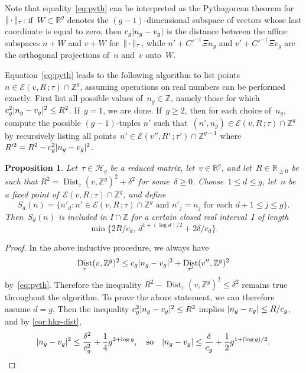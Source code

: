 \documentclass[12pt,oneside]{amsart}
\numberwithin{equation}{section}
\newtheorem{prop}[equation]{Proposition}
\theoremstyle{definition}
\newcommand{\Z}{\mathbb{Z}}
\newcommand{\R}{\mathbb{R}}
\newcommand{\Half}{\mathcal{H}}
\newcommand{\placeholder}{\,\cdot\,}
\newcommand{\eld}[3]{\ensuremath{\mathcal{E}(#1, #2\,; #3)}}
\DeclareMathOperator{\Dist}{Dist}
\DeclarePairedDelimiter{\abs}{|}{|}
\DeclarePairedDelimiter{\norm}{\|}{\|}
\begin{document}
Note that equality~\eqref{eq:pyth} can be interpreted as the Pythagorean
theorem for~$\norm{\placeholder}_\tau$: if~$W\subset \R^g$ denotes the
$(g-1)$-dimensional subspace of vectors whose last coordinate is equal to
zero, then $c_{g}\abs{n_{g} - v_{g}}$ is the distance between the affine
subspaces $n + W$ and $v + W$ for~$\norm{\placeholder}_\tau$, while
$n' + C'^{-1} \Xi n_{g}$ and $v' + C'^{-1} \Xi v_{g}$ are the orthogonal
projections of~$n$ and~$v$ onto~$W$.

Equation~\eqref{eq:pyth} leads to the following algorithm to list points
$n\in \eld{v}{R}{\tau}\cap \Z^g$, assuming operations on real numbers can be
performed exactly. First list all possible values of~$n_g \in \Z$, namely those
for which $c_g^2\abs{n_g - v_g}^2 \leq R^2$. If~$g=1$, we are done.
If~$g\geq 2$, then for each choice of~$n_g$, compute the possible
$(g-1)$-tuples $n'$ such that~$(n',n_g)\in \eld{v}{R}{\tau} \cap\Z^g$ by
recursively listing all points~$n'\in \eld{v''}{R'}{\tau'}\cap \Z^{g-1}$
where~$R'^2 = R^2 - c_g^2 \abs{n_g - v_g}^2$.

\begin{prop}
  \label{prop:eld-width}
  Let~$\tau\in \Half_g$ be a reduced matrix, let~$v\in \R^g$, and
  let~$R\in \R_{\geq 0}$ be such that $R^2 = \Dist_\tau(v,\Z^g)^2 + \delta^2$
  for some~$\delta\geq 0$. Choose~$1\leq d\leq g$, let~$n$ be a fixed point
  of~$\eld{v}{R}{\tau}\cap\Z^g$, and define
  \begin{displaymath}
    S_d(n) = \{n'_d: n'\in \eld{v}{R}{\tau}\cap\Z^g \text{ and } n'_j = n_j \text{ for each } d+1\leq j\leq g\}.
  \end{displaymath}
  Then~$S_d(n)$ is included in $I\cap\Z$ for a certain closed real interval~$I$ of
  length
  \begin{displaymath}
    \min\{2R/c_d,\, d^{1 + (\log d)/2} + 2\delta/c_d\}.
  \end{displaymath}
\end{prop}

\begin{proof}
  In the above inductive procedure, we always have
  \begin{displaymath}
    \Dist_\tau(v, \Z^g)^2 \leq c_g\abs{n_g - v_g}^2 + \Dist_{\tau'}(v'', \Z^g)^2
  \end{displaymath}
  by~\eqref{eq:pyth}. Therefore the inequality
  $R^2 - \Dist_\tau(v, \Z^g)^2\leq \delta^2$ remains true throughout the
  algorithm. To prove the above statement, we can therefore assume $d =
  g$. Then the inequality $c_g^2 \abs{n_g - v_g}^2 \leq R^2$ implies
  $\abs{n_g - v_g}\leq R/c_g$, and by \cref{cor:hkz-dist},
  \begin{displaymath}
    \abs{n_g - v_g}^2 \leq \frac{\delta^2}{c_g^2} + \frac 14 g^{2+\log g},
    \quad\text{so}\quad \abs{n_g - v_g} \leq \frac{\delta}{c_g} + \frac{1}{2} g^{1 + (\log g)/2}. \qedhere
  \end{displaymath}
\end{proof}
\end{document}
